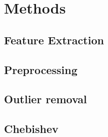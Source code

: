 
\chapter{Methods}\label{ch:methods}











\section{Feature Extraction}









\section{Preprocessing}

\section{Outlier removal}


\section{Chebishev}





